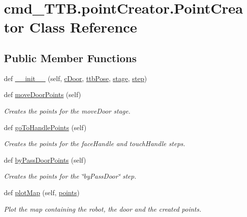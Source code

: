 \hypertarget{classcmd__TTB_1_1pointCreator_1_1PointCreator}{}\section{cmd\+\_\+\+T\+T\+B.\+point\+Creator.\+Point\+Creator Class Reference}
\label{classcmd__TTB_1_1pointCreator_1_1PointCreator}
\subsection*{Public Member Functions}
\begin{DoxyCompactItemize}
\item 
def \hyperlink{classcmd__TTB_1_1pointCreator_1_1PointCreator_a22aa433126ed8a208d6547016fe1e564}{\+\_\+\+\_\+init\+\_\+\+\_\+} (self, \hyperlink{classcmd__TTB_1_1pointCreator_1_1PointCreator_a7ed058c18c601c1c75dc7a0e965dc822}{c\+Door}, \hyperlink{classcmd__TTB_1_1pointCreator_1_1PointCreator_a21e4510de601ea33015ecd3b45cfafeb}{ttb\+Pose}, \hyperlink{classcmd__TTB_1_1pointCreator_1_1PointCreator_a33513665b686ce537a06fed0d6cb2eee}{stage}, \hyperlink{classcmd__TTB_1_1pointCreator_1_1PointCreator_a73d089e287c772c0f448da4b18b6d1ab}{step})
\item 
def \hyperlink{classcmd__TTB_1_1pointCreator_1_1PointCreator_a2efa5ee9b26fb53aac3f0b41f3d2ecda}{move\+Door\+Points} (self)
\begin{DoxyCompactList}\small\item\em Creates the points for the move\+Door stage. \end{DoxyCompactList}\item 
def \hyperlink{classcmd__TTB_1_1pointCreator_1_1PointCreator_a359567b295e7b7bb4b36fcb6bc962717}{go\+To\+Handle\+Points} (self)
\begin{DoxyCompactList}\small\item\em Creates the points for the face\+Handle and touch\+Handle steps. \end{DoxyCompactList}\item 
def \hyperlink{classcmd__TTB_1_1pointCreator_1_1PointCreator_af01910dd15edf3e018131ecbbfc5203f}{by\+Pass\+Door\+Points} (self)
\begin{DoxyCompactList}\small\item\em Creates the points for the \char`\"{}by\+Pass\+Door\char`\"{} step. \end{DoxyCompactList}\item 
def \hyperlink{classcmd__TTB_1_1pointCreator_1_1PointCreator_a0764b36d7a1d971835c3c8a110d78b91}{plot\+Map} (self, \hyperlink{classcmd__TTB_1_1pointCreator_1_1PointCreator_a59ce28204b76e1ab92e232ac4105933d}{points})
\begin{DoxyCompactList}\small\item\em Plot the map containing the robot, the door and the created points. \end{DoxyCompactList}\end{DoxyCompactItemize}
